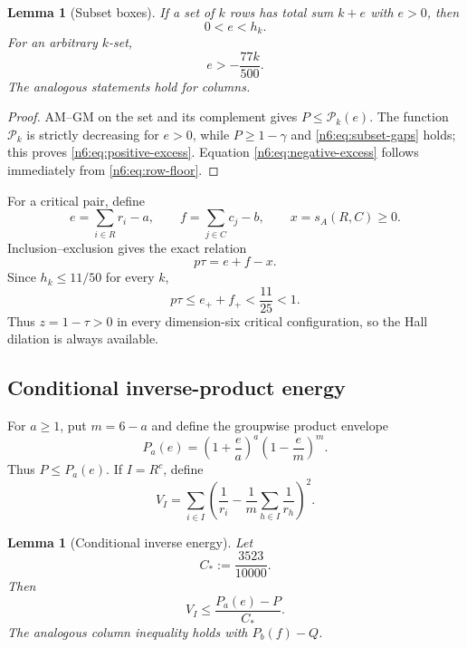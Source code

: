 \documentclass[11pt]{article}
\numberwithin{equation}{section}
\newtheorem{lemma}[theorem]{Lemma}
\theoremstyle{definition}
\begin{document}
\begin{lemma}[Subset boxes]\label{n6:lem:subset-boxes}
If a set of $k$ rows has total sum $k+e$ with $e>0$, then
\begin{equation}
 0<e<h_k.\label{n6:eq:positive-excess}
\end{equation}
For an arbitrary $k$-set,
\begin{equation}
 e>-\frac{77k}{500}.\label{n6:eq:negative-excess}
\end{equation}
The analogous statements hold for columns.
\end{lemma}

\begin{proof}
AM--GM on the set and its complement gives $P\le\mathcal P_k(e)$.
The function $\mathcal P_k$ is strictly decreasing for $e>0$, while
$P\ge1-\gamma$ and \eqref{n6:eq:subset-gaps} holds; this proves
\eqref{n6:eq:positive-excess}.  Equation \eqref{n6:eq:negative-excess}
follows immediately from \eqref{n6:eq:row-floor}.
\end{proof}

For a critical pair, define
\begin{equation}
 e=\sum_{i\in R}r_i-a,
 \qquad
 f=\sum_{j\in C}c_j-b,
 \qquad
 x=s_A(R,C)\ge0.\label{n6:eq:efx}
\end{equation}
Inclusion--exclusion gives the exact relation
\begin{equation}
 p\tau=e+f-x.\label{n6:eq:critical-relation}
\end{equation}
Since $h_k\le11/50$ for every $k$,
\[
 p\tau\le e_++f_+<\frac{11}{25}<1.
\]
Thus $z=1-\tau>0$ in every dimension-six critical configuration, so the Hall
dilation is always available.

\subsection{Conditional inverse-product energy}

For $a\ge1$, put $m=6-a$ and define the groupwise product envelope
\begin{equation}
 P_a(e)
 =\left(1+\frac ea\right)^a
  \left(1-\frac em\right)^m.\label{n6:eq:Pa}
\end{equation}
Thus $P\le P_a(e)$.  If $I=R^c$, define
\[
 V_I=\sum_{i\in I}
 \left(
  \frac1{r_i}-\frac1m\sum_{h\in I}\frac1{r_h}
 \right)^2.
\]

\begin{lemma}[Conditional inverse energy]\label{n6:lem:conditional-energy}
Let
\begin{equation}
 C_*:=\frac{3523}{10000}.\label{n6:eq:Cstar}
\end{equation}
Then
\begin{equation}
 V_I\le\frac{P_a(e)-P}{C_*}.\label{n6:eq:conditional-energy}
\end{equation}
The analogous column inequality holds with $P_b(f)-Q$.
\end{lemma}
\end{document}
